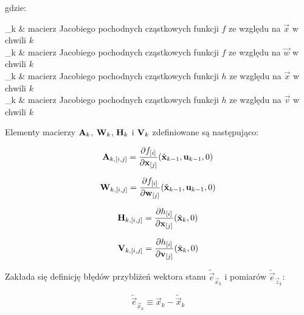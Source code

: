 \noindent
gdzie:

\begin{conditions}
	_k & macierz Jacobiego pochodnych cząstkowych funkcji $f$ ze względu na $\vec{x}$ w chwili $k$ \\
	_k & macierz Jacobiego pochodnych cząstkowych funkcji $f$ ze względu na $\vec{w}$ w chwili $k$ \\
	_k & macierz Jacobiego pochodnych cząstkowych funkcji $h$ ze względu na $\vec{x}$ w chwili $k$ \\
	_k & macierz Jacobiego pochodnych cząstkowych funkcji $h$ ze względu na $\vec{v}$ w chwili $k$ \\
\end{conditions}

\noindent
Elementy macierzy $\mathbf{A}_k$, $\mathbf{W}_k$, $\mathbf{H}_k$ i $\mathbf{V}_k$ zdefiniowane są następująco:

\begin{equation}
\label{equ:Rozszerzony_Filtr_Kalmana_macierz_A}
	\matr{A}_{k,[i,j]} = \frac{\partial f_{[i]}}{\partial \vec{x}_{[j]}} (\hat{\vec{x}}_{k-1}, \vec{u}_{k-1}, 0)
\end{equation}

\begin{equation}
\label{equ:Rozszerzony_Filtr_Kalmana_macierz_W}
	\matr{W}_{k,[i,j]} = \frac{\partial f_{[i]}}{\partial \vec{w}_{[j]}} (\hat{\vec{x}}_{k-1}, \vec{u}_{k-1}, 0)
\end{equation}

\begin{equation}
\label{equ:Rozszerzony_Filtr_Kalmana_macierz_H}
	\mathbf{H}_{k,[i,j]} = \frac{\partial h_{[i]}}{\partial \mathbf{x}_{[j]}} (\tilde{\mathbf{x}}_k, 0)
\end{equation}

\begin{equation}
\label{equ:Rozszerzony_Filtr_Kalmana_macierz_V}
	\mathbf{V}_{k,[i,j]} = \frac{\partial h_{[i]}}{\partial \mathbf{v}_{[j]}} (\tilde{\mathbf{x}}_k, 0)
\end{equation}

\noindent
Zakłada się definicję błędów przybliżeń wektora stanu $\tilde{\vec{e}}_{\vec{x}_k}$ i pomiarów $\tilde{\vec{e}}_{\vec{z}_k}$:

\begin{equation}
\label{equ:Rozszerzony_Filtr_Kalmana_blad_stanu}
	\tilde{\vec{e}}_{\vec{x}_k} \equiv \vec{x}_k - \tilde{\vec{x}}_k
\end{equation}

